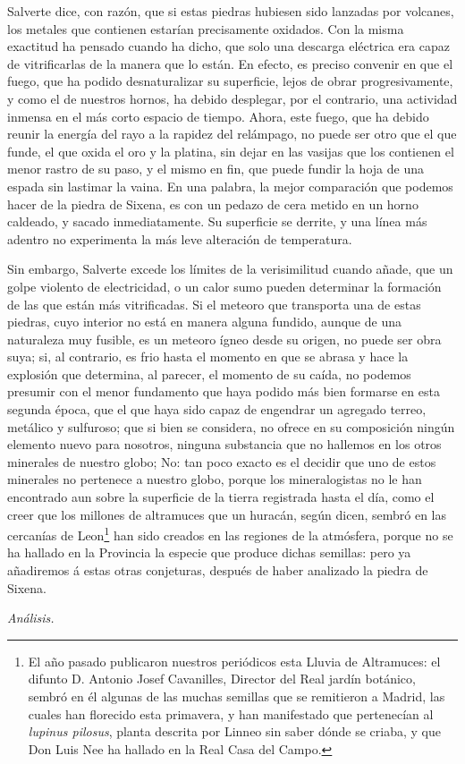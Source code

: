 \documentclass[a4paper, 11pt, oneside, polutonikogreek, spanish]{article}
\begin{document}
Salverte dice, con razón, que si estas piedras hubiesen sido lanzadas por volcanes, los metales que contienen estarían precisamente oxidados. Con la misma exactitud ha pensado cuando ha dicho, que solo una descarga eléctrica era capaz de vitrificarlas de la manera que lo están. En efecto, es preciso convenir en que el fuego, que ha podido desnaturalizar su superficie, lejos de obrar progresivamente, y como el de nuestros hornos, ha debido desplegar, por el contrario, una actividad inmensa en el más corto espacio de tiempo. Ahora, este fuego, que ha debido reunir la energía del rayo a la rapidez del relámpago, no puede ser otro que el que funde, el que oxida el oro y la platina, sin dejar en las vasijas que los contienen el menor rastro de su paso, y el mismo en fin, que puede fundir la hoja de una espada sin lastimar la vaina. En una palabra, la mejor comparación que podemos hacer de la piedra de Sixena, es con un pedazo de cera metido en un horno caldeado, y sacado inmediatamente. Su superficie se derrite, y una línea más adentro no experimenta la más leve alteración de temperatura.

Sin embargo, Salverte excede los límites de la verisimilitud cuando añade, que un golpe violento de electricidad, o un calor sumo pueden determinar la formación de las que están más vitrificadas. Si el meteoro que transporta una de estas piedras, cuyo interior no está en manera alguna fundido, aunque de una naturaleza muy fusible, es un meteoro ígneo desde su origen, no puede ser obra suya; si, al contrario, es frio hasta el momento en que se abrasa y hace la explosión que determina, al parecer, el momento de su caída, no podemos presumir con el menor fundamento que haya podido más bien formarse en esta segunda época, que el que haya sido capaz de engendrar un agregado terreo, metálico y sulfuroso; que si bien se considera, no ofrece en su composición ningún elemento nuevo para nosotros, ninguna substancia que no hallemos en los otros minerales de nuestro globo; No: tan poco exacto es el decidir que uno de estos minerales no pertenece a nuestro globo, porque los mineralogistas no le han encontrado aun sobre la superficie de la tierra registrada hasta el día, como el creer que los millones de altramuces que un huracán, según dicen, sembró en las cercanías de Leon\footnote{El año pasado publicaron nuestros periódicos esta Lluvia de Altramuces: el difunto D. Antonio Josef Cavanilles, Director del Real jardín botánico, sembró en él algunas de las muchas semillas que se remitieron a Madrid, las cuales han florecido esta primavera, y han manifestado que pertenecían al \emph{lupinus pilosus}, planta descrita por Linneo sin saber dónde se criaba, y que Don Luis Nee ha hallado en la Real Casa del Campo.} han sido creados en las regiones de la atmósfera, porque no se ha hallado en la Provincia la especie que produce dichas semillas: pero ya añadiremos á estas otras conjeturas, después de haber analizado la piedra de Sixena.
\begin{center}
\emph{Análisis.}
\end{center}
\end{document}
